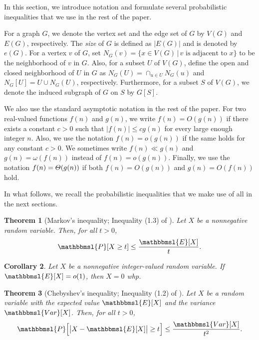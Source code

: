 \documentclass[hidelinks, 11pt]{article}
\theoremstyle{plain}
\newtheorem{theorem}{Theorem}[section]
\newtheorem{corollary}[theorem]{Corollary}
\theoremstyle{definition}
\begin{document}
In this section, we introduce notation  and formulate several probabilistic inequalities  that we use in the rest of the  paper.


For a graph $G$, we denote  the vertex set and the edge set of   $G$  by $V(G)$ and $E(G)$, respectively.
The  {\sl size} of $G$ is  defined as   $|E(G)|$ and is denoted by $e(G)$.
For a vertex $v$ of $G$, set $N_G(v)=\{x\in V(G) \, | \, v \text{  is adjacent to } x\}$ to be the neighborhood of   $v$ in $G$. Also, for a subset $U$ of $V(G)$, define the open and closed neighborhood of $U$ in $G$ as $N_G(U)=\cap_{u\in U} N_G(u)$  and $N_G[U]=U \cup N_G(U)$, respectively.
Furthermore, for  a subset $S$ of $V(G)$, we denote the induced subgraph of $G$ on $S$  by $G[S]$.


We also use the standard asymptotic notation in the rest of the paper. For two real-valued functions $f(n)$ and $g(n)$, we write $f(n)=O(g(n))$ if there exists a constant $c>0$   such that $|f(n)|\leq cg(n)$ for every   large enough integer $n$. Also, we use the notation  $f(n)=o(g(n))$ if the same holds for any constant $c>0$.    We sometimes  write    $f(n)\ll g(n)$  and   $g(n)=\omega(f(n))$ instead of   $f(n)=o(g(n))$. Finally, we use the notation   $f(n)=\mathnormal{\Theta}(g(n))$ if both   $f(n)=O(g(n))$ and $g(n)=O(f(n))$  hold.



In what follows, we   recall the  probabilistic inequalities that we make use of all in the  next sections.



\begin{theorem}[Markov's inequality;  Inequality (1.3)  of  \cite{RG}]\label{Markov}
Let   $X$ be a  nonnegative  random variable. Then,  for all  $t>0$,
$$\mathbbmsl{P}[X\geq t]\leq\frac{\mathbbmsl{E}[X]}{t}.$$
\end{theorem}



\begin{corollary}\label{First-Moment}
Let   $X$ be a   nonnegative  integer-valued       random variable. If   $\mathbbmsl{E}[X]=o(1)$, then $X=0$  whp.
\end{corollary}



\begin{theorem}[Chebyshev's inequality;  Inequality (1.2)  of  \cite{RG}]\label{chebyshev}
Let   $X$ be a  random variable with the expected value    $\mathbbmsl{E}[X]$ and   the variance  $\mathbbmsl{Var}[X]$. Then,  for all  $t>0$,
$$\mathbbmsl{P}\Big[\big|X-\mathbbmsl{E}[X]\big|\geq t\Big]\leq\frac{\mathbbmsl{Var}[X]}{t^2}.$$
\end{theorem}
\end{document}
